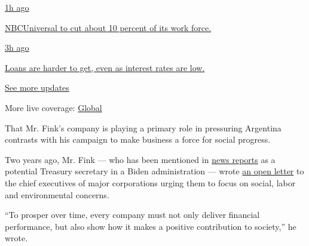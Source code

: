 \href{https://www.nytimes.com/live/2020/08/04/business/stock-market-today-coronavirus?action=click\&pgtype=Article\&state=default\&region=MAIN_CONTENT_1\&context=storylines_live_updates\#nbcuniversal-to-cut-about-10-percent-of-its-work-force}{1h
ago}

\href{https://www.nytimes.com/live/2020/08/04/business/stock-market-today-coronavirus?action=click\&pgtype=Article\&state=default\&region=MAIN_CONTENT_1\&context=storylines_live_updates\#nbcuniversal-to-cut-about-10-percent-of-its-work-force}{NBCUniversal
to cut about 10 percent of its work force.}

\href{https://www.nytimes.com/live/2020/08/04/business/stock-market-today-coronavirus?action=click\&pgtype=Article\&state=default\&region=MAIN_CONTENT_1\&context=storylines_live_updates\#loans-are-harder-to-get-even-as-interest-rates-are-low}{3h
ago}

\href{https://www.nytimes.com/live/2020/08/04/business/stock-market-today-coronavirus?action=click\&pgtype=Article\&state=default\&region=MAIN_CONTENT_1\&context=storylines_live_updates\#loans-are-harder-to-get-even-as-interest-rates-are-low}{Loans
are harder to get, even as interest rates are low.}

\href{https://www.nytimes.com/live/2020/08/04/business/stock-market-today-coronavirus?action=click\&pgtype=Article\&state=default\&region=MAIN_CONTENT_1\&context=storylines_live_updates}{See
more updates}

More live coverage:
\href{https://www.nytimes.com/2020/08/04/world/coronavirus-cases.html?action=click\&pgtype=Article\&state=default\&region=MAIN_CONTENT_1\&context=storylines_live_updates}{Global}

That Mr. Fink's company is playing a primary role in pressuring
Argentina contrasts with his campaign to make business a force for
social progress.

Two years ago, Mr. Fink --- who has been mentioned in
\href{https://www.cnbc.com/2020/04/06/biden-donors-float-elizabeth-warren-larry-fink-others-for-key-roles.html}{news
reports} as a potential Treasury secretary in a Biden administration ---
wrote
\href{http://www.corporance.es/wp-content/uploads/2018/01/Larry-Fink-letter-to-CEOs-2018-1.pdf}{an
open letter} to the chief executives of major corporations urging them
to focus on social, labor and environmental concerns.

``To prosper over time, every company must not only deliver financial
performance, but also show how it makes a positive contribution to
society,'' he wrote.

